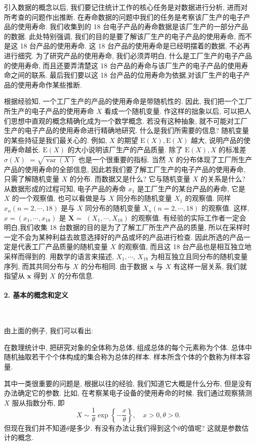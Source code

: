 引入数据的概念以后, 我们要记住统计工作的核心任务是对数据进行分析, 进而对所考查的问题作出推断. 在寿命数据的问题中我们的任务是考察该厂生产的电子产品的使用寿命. 我们收集到的 18 台电子产品的寿命数据是该厂生产的一部分产品的数据. 此处特别强调, 我们的目的是要了解该厂生产的电子产品的使用寿命, 而不是这 18 台产品的使用寿命. 这 18 台产品的使用寿命是已经明摆着的数据, 不必再进行细究. 为了研究产品的使用寿命, 我们必须弄明白, 什么是工厂生产的电子产品的使用寿命, 而且还要弄清楚这 18 台产品的寿命与该厂生产的电子产品的使用寿命之间的联系. 最后我们要以这 18 台产品的位用寿命为依据,对该厂生产的电子产品的使用寿命作某些推断. 

根据经验知, 一个工厂生产的产品的使用寿命是带随机性的. 因此, 我们把一个工厂所生产的电子产品的使用寿命 $X$ 看成一个随机变量. 作这样的拙象以后, 可以把人们思想中直观的概念精确化成为一个数学概念. 若没有这种抽象, 就不可能对工厂生产的电子产品的使用寿命进行精确地研究. 什么是我们所需要的信息? 随机变量的某些持征是我们最关心的. 例如, $X$ 的期望 $\mathrm{E}(X), \mathrm{E}(X)$ 越大, 说明产品的使用寿命越长. $\mathrm{E}(X)$ 的大小说明该厂生产的产品质量. 除了 $\mathrm{E}(X), X$ 的标准差 $\sigma(X)$ $=\sqrt{\operatorname{var}(X)}$ 也是一个很重要的指标. 当然 $X$ 的分布体现了工厂所生产产品的使用寿命的全部信息, 因此若我们要了解工厂生产的电子产品的使用寿命, 只需了解随机变量 $X$ 的分布. 而数据又是什么? 它与随机变量 $X$ 的关系是什么? 从数据形成的过程可知, 电子产品的寿命 $x_1$ 是工厂生产的某台产品的寿命, 它是 $X$ 的一个观察值, 也可以看做是与 $X$ 同分布的随机变量 $X_1$ 的观察值. 同样 $x_n(n=2, \cdots, 18)$ 是与 $X$ 同分布的随机变量 $X_n(n=2, \cdots, 18)$ 的观察值. 这样, $x=\left(x_1, \cdots, x_{18}\right)$ 是 $\boldsymbol{X}=$ $\left(X_1, \cdots, X_{18}\right)$ 的观察值. 有经验的实际工作者一定会明白,我们收集 18 台数据的目的是为了了解工厂所生产产品的质量, 所以在采样时一定不会为某种利益去故意选择好的产品或坏的产品进行检查. 因此所选的产品一定是代表工厂产品质量的随机变量 $X$ 的观察值, 而且这 18 台产品也是相互独立地采样而得到的. 用数学的语言来描述, $X_1, \cdots$, $X_{18}$ 为相互独立且同分布的随机变量序列, 而其共同分布与 $X$ 的分布相同. 由于数据 $\boldsymbol{x}$ 与 $X$ 有这样一层关系, 我们就指望从 $\boldsymbol{x}$ 得到 $X$ 的分布信息.

\paragraph{2. 基本的概念和定义}

~

由上面的例子, 我们可以看出: 

\begin{definition}
    在数理统计中, 把研究对象的全体称为总体, 组成总体的每个元素称为个体. 总体中随机抽取若干个个体构成的集合称为总体的样本. 样本所含个体的个数称为样本容量. 
\end{definition}

其中一类很重要的问题是, 根据以往的经验, 我们知道它大概是什么分布, 但是没有办法确定它的参数. 比如, 在考察某电子设备的使用寿命的时候. 我们通过观察猜测 $X$ 服从指数分布, 即
$$
X \sim \frac{1}{\theta} \exp \left\{-\frac{x}{\theta}\right\}, \quad x>0, \theta>0 .
$$
但现在我们并不知道$\theta$是多少. 有没有办法让我们得到这个$\theta$的值呢? 这就是参数估计的概念. 